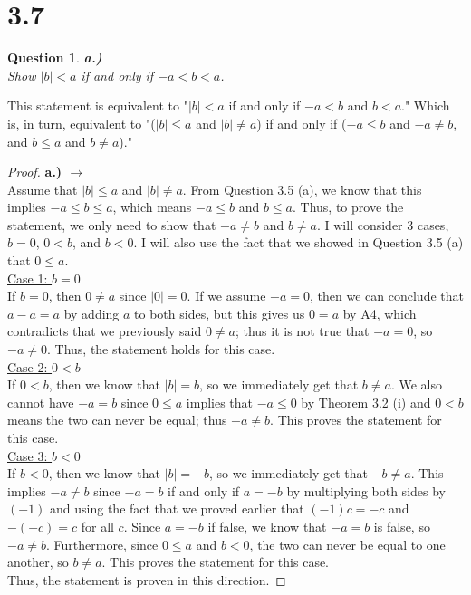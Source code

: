 \documentclass[10pt,a4paper]{article}
\newtheorem*{question*}{Question}
\theoremstyle{definition}
\begin{document}
\section*{3.7}
\begin{question*}{\textbf{a.)}}
\\Show $|b| < a$ if and only if $-a<b<a$.
\end{question*}
{$ $}
\\This statement is equivalent to "$|b| < a$ if and only if $-a < b$ and $b < a$." Which is, in turn, equivalent to "($|b| \leq a$ and $|b| \neq a$) if and only if ($-a \leq b$ and $-a \neq b$, and $b \leq a$ and $b \neq a$)."
\begin{proof}{\textbf{a.) $\rightarrow$}}
\\Assume that $|b| \leq a$ and $|b| \neq a$. From Question 3.5 (a), we know that this implies $-a \leq b \leq a$, which means $-a \leq b$ and $b \leq a$. Thus, to prove the statement, we only need to show that $-a \neq b$ and $b \neq a$. I will consider 3 cases, $b = 0$, $0 < b$, and $b < 0$. I will also use the fact that we showed in Question 3.5 (a) that $0 \leq a$. 
\\\underline{Case 1: $b= 0$}
\\If $b = 0$, then $0 \neq a$ since $|0| = 0$. If we assume $-a = 0$, then we can conclude that $a - a = a$ by adding $a$ to both sides, but this gives us $0 = a$ by A4, which contradicts that we previously said $0 \neq a$; thus it is not true that $-a = 0$, so $-a \neq 0$. Thus, the statement holds for this case. 
{$ $}
\\\underline{Case 2: $0 < b$}
\\If $0 < b$, then we know that $|b| = b$, so we immediately get that $b \neq a$. We also cannot have $-a = b$ since $0 \leq a$ implies that $-a \leq 0$ by Theorem 3.2 (i) and $0 < b$ means the two can never be equal; thus $-a \neq b$. This proves the statement for this case. 
{$ $}
\\\underline{Case 3: $b < 0$}
\\If $b < 0$, then we know that $|b| = -b$, so we immediately get that $-b \neq a$. This implies $-a \neq b$ since $-a = b$ if and only if $a = -b$ by multiplying both sides by $(-1)$ and using the fact that we proved earlier that $(-1)c = -c$ and $-(-c) = c$ for all $c$. Since $a = -b$ if false, we know that $-a = b$ is false, so $-a \neq b$. Furthermore, since $0 \leq a$ and $b < 0$, the two can never be equal to one another, so $b \neq a$. This proves the statement for this case. 
\\Thus, the statement is proven in this direction. 
\end{proof}
\end{document}
